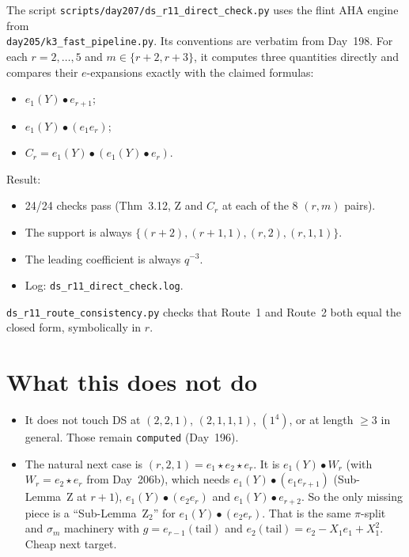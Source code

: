 \documentclass[11pt]{amsart}
\theoremstyle{remark}
\newcommand{\st}{\star}
\begin{document}
The script \texttt{scripts/day207/ds\_r11\_direct\_check.py} uses the flint AHA engine from\\ \texttt{day205/k3\_fast\_pipeline.py}. Its conventions are verbatim from Day~198. For each $r=2,\dots,5$ and $m\in\{r+2,r+3\}$, it computes three quantities directly and compares their $e$-expansions exactly with the claimed formulas:
\begin{itemize}
\item $e_1(Y)\bullet e_{r+1}$;
\item $e_1(Y)\bullet(e_1e_r)$;
\item $C_r=e_1(Y)\bullet(e_1(Y)\bullet e_r)$.
\end{itemize}
Result:
\begin{itemize}
\item 24/24 checks pass (Thm~3.12, Z and $C_r$ at each of the 8 $(r,m)$ pairs).
\item The support is always $\{(r+2),(r+1,1),(r,2),(r,1,1)\}$.
\item The leading coefficient is always $q^{-3}$.
\item Log: \texttt{ds\_r11\_direct\_check.log}.
\end{itemize}
\texttt{ds\_r11\_route\_consistency.py} checks that Route~1 and Route~2 both equal the closed form, symbolically in $r$.

\section{What this does not do}\label{sec:scope}

\begin{itemize}
\item It does not touch DS at $(2,2,1)$, $(2,1,1,1)$, $(1^4)$, or at length $\ge3$ in general. Those remain \texttt{computed} (Day~196).
\item The natural next case is $(r,2,1)=e_1\st e_2\st e_r$. It is $e_1(Y)\bullet W_r$ (with $W_r=e_2\st e_r$ from Day~206b), which needs $e_1(Y)\bullet(e_1e_{r+1})$ (Sub-Lemma~Z at $r+1$), $e_1(Y)\bullet(e_2e_r)$ and $e_1(Y)\bullet e_{r+2}$. So the only missing piece is a ``Sub-Lemma~Z$_2$'' for $e_1(Y)\bullet(e_2e_r)$. That is the same $\pi$-split and $\sigma_m$ machinery with $g=e_{r-1}(\mathrm{tail})$ and $e_2(\mathrm{tail})=e_2-X_1e_1+X_1^2$. Cheap next target.
\end{itemize}
\end{document}
